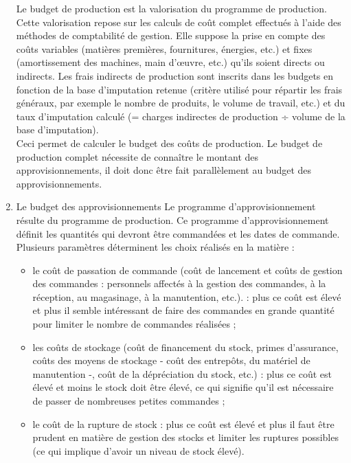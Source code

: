 \documentclass{tufte-handout}
\begin{document}
\begin{enumerate}
Le budget de production est la valorisation du programme de production. Cette valorisation repose sur les calculs de coût complet effectués à l'aide des méthodes de comptabilité de gestion. Elle suppose la prise en compte des coûts variables (matières premières, fournitures, énergies, etc.) et fixes (amortissement des machines, main d'œuvre, etc.) qu'ils soient directs ou indirects. Les frais indirects de production sont inscrits dans les budgets en fonction de la base d'imputation retenue (critère utilisé pour répartir les frais généraux, par exemple le nombre de produits, le volume de travail, etc.) et du taux d'imputation calculé (= charges indirectes de production ÷ volume de la base d'imputation).\\
Ceci permet de calculer le budget des coûts de production. Le budget de production complet nécessite de connaître le montant des approvisionnements, il doit donc être fait parallèlement au budget des approvisionnements.\\
\item Le budget des approvisionnements
\label{sec:org1271f5c}
Le programme d'approvisionnement résulte du programme de production. Ce programme d'approvisionnement définit les quantités qui devront être commandées et les dates de commande. Plusieurs paramètres déterminent les choix réalisés en la matière :\\
\begin{itemize}
\item le coût de passation de commande (coût de lancement et coûts de gestion des commandes : personnels affectés à la gestion des commandes, à la réception, au magasinage, à la manutention, etc.). : plus ce coût est élevé et plus il semble intéressant de faire des commandes en grande quantité pour limiter le nombre de commandes réalisées ;\\
\item les coûts de stockage (coût de financement du stock, primes d'assurance, coûts des moyens de stockage - coût des entrepôts, du matériel de manutention -, coût de la dépréciation du stock, etc.) : plus ce coût est élevé et moins le stock doit être élevé, ce qui signifie qu'il est nécessaire de passer de nombreuses petites commandes ;\\
\item le coût de la rupture de stock : plus ce coût est élevé et plus il faut être prudent en matière de gestion des stocks et limiter les ruptures possibles (ce qui implique d'avoir un niveau de stock élevé).\\

\end{itemize}
\end{enumerate}
\end{document}
